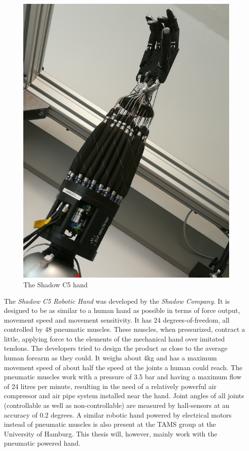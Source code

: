 \begin{figure}
	\vspace{-2.2em}
	\caption{The Shadow C5 hand}
	\includegraphics[width=\linewidth]{assets/chpt_basics/hand.png}
\end{figure}

The \textit{Shadow C5 Robotic Hand} was developed by the \textit{Shadow Company}. It is designed to be as similar to a human hand as possible\cite{web:robothand:spec} in terms of force output, movement speed and movement sensitivity. It has 24 degrees-of-freedom, all controlled by 48 pneumatic muscles. These muscles, when pressurized, contract a little, applying force to the elements of the mechanical hand over imitated tendons. The developers tried to design the product as close to the average human forearm as they could. It weighs about 4kg and has a maximum movement speed of about half the speed at the joints a human could reach. The pneumatic muscles work with a pressure of 3.5 bar and having a maximum flow of 24 litres per minute, resulting in the need of a relatively powerful air compressor and air pipe system installed near the hand. Joint angles of all joints (controllable as well as non-controllable) are measured by hall-sensors at an accuracy of 0.2 degrees.
A similar robotic hand powered by electrical motors instead of pneumatic muscles is also present at the TAMS group at the University of Hamburg. This thesis will, however, mainly work with the pneumatic powered hand. 
\newpage
